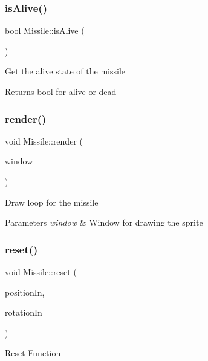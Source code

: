 \subsubsection{\texorpdfstring{isAlive()}{isAlive()}}
{\footnotesize\ttfamily bool Missile\+::is\+Alive (\begin{DoxyParamCaption}{ }\end{DoxyParamCaption})}



Get the alive state of the missile 

\begin{DoxyReturn}{Returns}
bool for alive or dead
\end{DoxyReturn}
\mbox{\label{class_missile_a882289a30763d8307727a674655c7367}} 
\subsubsection{\texorpdfstring{render()}{render()}}
{\footnotesize\ttfamily void Missile\+::render (\begin{DoxyParamCaption}\item[{sf\+::\+Render\+Window \&}]{window }\end{DoxyParamCaption})}



Draw loop for the missile 


\begin{DoxyParams}{Parameters}
{\em window} & Window for drawing the sprite\\
\hline
\end{DoxyParams}
\mbox{\label{class_missile_ac3e41d15fab89b6bf92b5437b039d5e3}} 
\subsubsection{\texorpdfstring{reset()}{reset()}}
{\footnotesize\ttfamily void Missile\+::reset (\begin{DoxyParamCaption}\item[{sf\+::\+Vector2f}]{position\+In,  }\item[{float}]{rotation\+In }\end{DoxyParamCaption})}



Reset Function 


